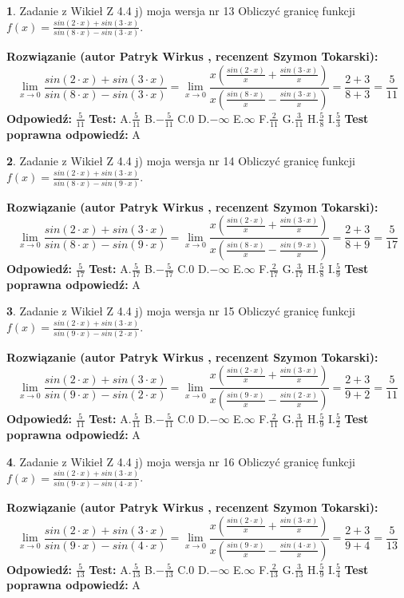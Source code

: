 \documentclass[12pt, a4paper]{article}
\theoremstyle{definition} %
\newtheorem{zad}{}
\newcommand{\zadStart}[1]{\begin{zad}#1\newline}
\newcommand{\zadStop}{\end{zad}}
\newcommand{\rozwStart}[2]{\noindent \textbf{Rozwiązanie (autor #1 , recenzent #2): }\newline}
\newcommand{\rozwStop}{\newline}
\newcommand{\odpStart}{\noindent \textbf{Odpowiedź:}\newline}
\newcommand{\odpStop}{\newline}
\newcommand{\testStart}{\noindent \textbf{Test:}\newline}
\newcommand{\testStop}{\newline}
\newcommand{\kluczStart}{\noindent \textbf{Test poprawna odpowiedź:}\newline}
\newcommand{\kluczStop}{\newline}
\begin{document}
\zadStart{Zadanie z Wikieł Z 4.4 j) moja wersja nr 13}
Obliczyć granicę funkcji $f(x)=\frac{sin(2\cdot x) +sin(3\cdot x)}{sin(8\cdot x) -sin(3\cdot x)}$.
\zadStop
\rozwStart{Patryk Wirkus}{Szymon Tokarski}
$$\lim\limits_{x\to 0}\frac{sin(2\cdot x) +sin(3\cdot x)}{sin(8\cdot x) -sin(3\cdot x)}=\lim\limits_{x\to 0}\frac{x(\frac{sin(2\cdot x)}{x}+\frac{sin(3\cdot x)}{x})}{x(\frac{sin(8\cdot x)}{x}-\frac{sin(3\cdot x)}{x})}=\frac{2+3}{8+3} = \frac{5}{11}$$
\rozwStop
\odpStart
$\frac{5}{11}$
\odpStop
\testStart
A.$\frac{5}{11}$
B.$-\frac{5}{11}$
C.$0$
D.$-\infty$
E.$\infty$
F.$\frac{2}{11}$
G.$\frac{3}{11}$
H.$\frac{5}{8}$
I.$\frac{5}{3}$
\testStop
\kluczStart
A
\kluczStop



\zadStart{Zadanie z Wikieł Z 4.4 j) moja wersja nr 14}
Obliczyć granicę funkcji $f(x)=\frac{sin(2\cdot x) +sin(3\cdot x)}{sin(8\cdot x) -sin(9\cdot x)}$.
\zadStop
\rozwStart{Patryk Wirkus}{Szymon Tokarski}
$$\lim\limits_{x\to 0}\frac{sin(2\cdot x) +sin(3\cdot x)}{sin(8\cdot x) -sin(9\cdot x)}=\lim\limits_{x\to 0}\frac{x(\frac{sin(2\cdot x)}{x}+\frac{sin(3\cdot x)}{x})}{x(\frac{sin(8\cdot x)}{x}-\frac{sin(9\cdot x)}{x})}=\frac{2+3}{8+9} = \frac{5}{17}$$
\rozwStop
\odpStart
$\frac{5}{17}$
\odpStop
\testStart
A.$\frac{5}{17}$
B.$-\frac{5}{17}$
C.$0$
D.$-\infty$
E.$\infty$
F.$\frac{2}{17}$
G.$\frac{3}{17}$
H.$\frac{5}{8}$
I.$\frac{5}{9}$
\testStop
\kluczStart
A
\kluczStop



\zadStart{Zadanie z Wikieł Z 4.4 j) moja wersja nr 15}
Obliczyć granicę funkcji $f(x)=\frac{sin(2\cdot x) +sin(3\cdot x)}{sin(9\cdot x) -sin(2\cdot x)}$.
\zadStop
\rozwStart{Patryk Wirkus}{Szymon Tokarski}
$$\lim\limits_{x\to 0}\frac{sin(2\cdot x) +sin(3\cdot x)}{sin(9\cdot x) -sin(2\cdot x)}=\lim\limits_{x\to 0}\frac{x(\frac{sin(2\cdot x)}{x}+\frac{sin(3\cdot x)}{x})}{x(\frac{sin(9\cdot x)}{x}-\frac{sin(2\cdot x)}{x})}=\frac{2+3}{9+2} = \frac{5}{11}$$
\rozwStop
\odpStart
$\frac{5}{11}$
\odpStop
\testStart
A.$\frac{5}{11}$
B.$-\frac{5}{11}$
C.$0$
D.$-\infty$
E.$\infty$
F.$\frac{2}{11}$
G.$\frac{3}{11}$
H.$\frac{5}{9}$
I.$\frac{5}{2}$
\testStop
\kluczStart
A
\kluczStop



\zadStart{Zadanie z Wikieł Z 4.4 j) moja wersja nr 16}
Obliczyć granicę funkcji $f(x)=\frac{sin(2\cdot x) +sin(3\cdot x)}{sin(9\cdot x) -sin(4\cdot x)}$.
\zadStop
\rozwStart{Patryk Wirkus}{Szymon Tokarski}
$$\lim\limits_{x\to 0}\frac{sin(2\cdot x) +sin(3\cdot x)}{sin(9\cdot x) -sin(4\cdot x)}=\lim\limits_{x\to 0}\frac{x(\frac{sin(2\cdot x)}{x}+\frac{sin(3\cdot x)}{x})}{x(\frac{sin(9\cdot x)}{x}-\frac{sin(4\cdot x)}{x})}=\frac{2+3}{9+4} = \frac{5}{13}$$
\rozwStop
\odpStart
$\frac{5}{13}$
\odpStop
\testStart
A.$\frac{5}{13}$
B.$-\frac{5}{13}$
C.$0$
D.$-\infty$
E.$\infty$
F.$\frac{2}{13}$
G.$\frac{3}{13}$
H.$\frac{5}{9}$
I.$\frac{5}{4}$
\testStop
\kluczStart
A
\kluczStop
\end{document}
